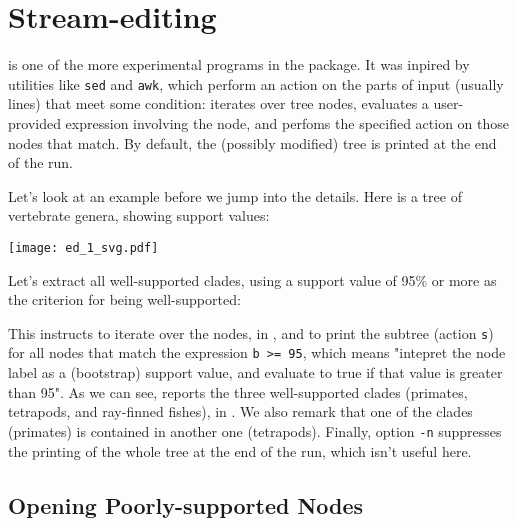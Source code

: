 \section{Stream-editing}
\label{sct_ed}

\ed{} is one of the more experimental programs in the \nutils{} package. It was
inpired by \unix{} utilities like \texttt{sed} and \texttt{awk}, which perform
an action on the parts of input (usually lines) that meet some condition: 
\ed{} iterates over tree nodes, evaluates a user-provided expression involving
the node, and perfoms the specified action on those nodes that match. By
default, the (possibly modified) tree is printed at the end of the run.

Let's look at an example before we jump into the details. Here is a tree of vertebrate genera, showing support values:


\begin{center}
\texttt{[image: ed\_1\_svg.pdf]}
\end{center}

\noindent{}Let's extract all well-supported clades, using a support value of 95\% or more as the criterion for being well-supported:




\noindent{}This instructs \ed{} to iterate over the nodes, in \no{}, and to
print the subtree (action \texttt{s}) for all nodes that match the expression
\texttt{b >= 95}, which means "intepret the node label as a (bootstrap) support
value, and evaluate to true if that value is greater than 95". As we can see,
\ed{} reports the three well-supported clades (primates, tetrapods, and
ray-finned fishes), in \no. We also remark that one of the clades
(primates) is contained in another one (tetrapods). Finally, option \texttt{-n}
suppresses the printing of the whole tree at the end of the run, which isn't
useful here.

\subsection{Opening Poorly-supported Nodes}
